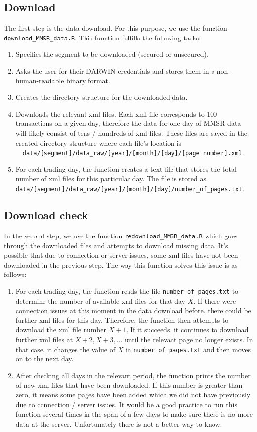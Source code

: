 \subsection{Download}
The first step is the data download. For this purpose, we use the function \verb|download_MMSR_data.R|. This function fulfills the following tasks:
\begin{enumerate}
	\item Specifies the segment to be downloaded (secured or unsecured).
	\item Asks the user for their DARWIN credentials and stores them in a non-human-readable binary format.
	\item Creates the directory structure for the downloaded data. 
	\item Downloads the relevant xml files. Each xml file corresponds to 100 transactions on a given day, therefore the data for one day of MMSR data will likely consist of tens / hundreds of xml files. These files are saved in the created directory structure where each file's location is \ \ \verb|data/[segment]/data_raw/[year]/[month]/[day]/[page number].xml|.
	\item For each trading day, the function creates a text file that stores the total number of xml files for this particular day. The file is stored as \newline \verb|data/[segment]/data_raw/[year]/[month]/[day]/number_of_pages.txt|.
\end{enumerate}

\subsection{Download check}
In the second step, we use the function \verb|redownload_MMSR_data.R| which goes through the downloaded files and attempts to download missing data. It's possible that due to connection or server issues, some xml files have not been downloaded in the previous step. The way this function solves this issue is as follows:
\begin{enumerate}
	\item For each trading day, the function reads the file \verb|number_of_pages.txt| to determine the number of available xml files for that day $X$. If there were connection issues at this moment in the data download before, there could be further xml files for this day. Therefore, the function then attempts to download the xml file number $X+1$. If it succeeds, it continues to download further xml files at $X+2, X+3, \ldots$ until the relevant page no longer exists. In that case, it changes the value of $X$ in \verb|number_of_pages.txt| and then moves on to the next day.
	\item After checking all days in the relevant period, the function prints the number of new xml files that have been downloaded. If this number is greater than zero, it means some pages have been added which we did not have previously due to connection / server issues. It would be a good practice to run this function several times in the span of a few days to make sure there is no more data at the server. Unfortunately there is not a better way to know.
\end{enumerate}


